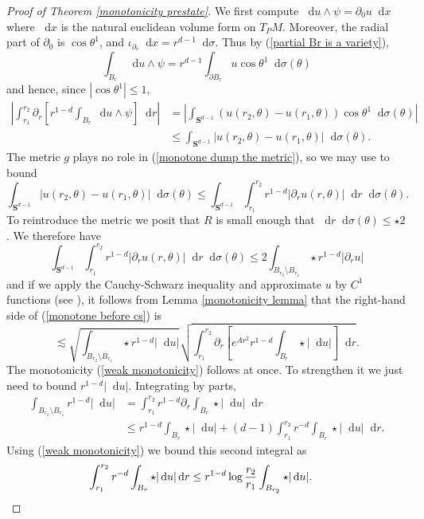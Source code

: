 \documentclass[reqno,10pt]{amsart}
\newcommand{\Sph}{\mathbf S}
\newcommand*\dif{\mathop{}\!\mathrm{d}}
\theoremstyle{definition}
\numberwithin{equation}{section}
\begin{document}
\begin{proof}[Proof of Theorem \ref{monotonicity prestate}]
We first compute $\dif u \wedge \psi = \partial_0 u \dif x$
where $\dif x$ is the natural euclidean volume form on $T_PM$.
Moreover, the radial part of $\partial_0$ is $\cos \theta^1$, and $\iota_{\partial_r} \dif x = r^{d - 1} \dif \sigma$.
Thus by (\ref{partial Br is a variety}),
$$\int_{B_r} \dif u \wedge \psi = r^{d - 1}\int_{\partial B_r} u \cos \theta^1 \dif \sigma(\theta)$$
and hence, since $|\cos \theta^1| \leq 1$,
\begin{align}
\left|\int_{r_1}^{r_2} \partial_r \left[r^{1 - d}\int_{B_r} \dif u \wedge \psi\right] \dif r\right|
&= \left|\int_{\Sph^{d - 1}} (u(r_2, \theta) - u(r_1, \theta)) \cos \theta^1 \dif \sigma(\theta)\right| \\
&\leq \int_{\Sph^{d - 1}} |u(r_2, \theta) - u(r_1, \theta)| \dif \sigma(\theta). \label{monotone dump the metric}
\end{align}
The metric $g$ plays no role in (\ref{monotone dump the metric}), so we may use \cite[Lemma 5.3]{Giusti77} to bound
$$\int_{\Sph^{d - 1}} |u(r_2, \theta) - u(r_1, \theta)| \dif \sigma(\theta) \leq \int_{\Sph^{d - 1}} \int_{r_1}^{r_2} r^{1 - d}|\partial_r u(r, \theta)| \dif r \dif\sigma(\theta).$$
To reintroduce the metric we posit that $R$ is small enough that $\dif r \dif \sigma(\theta) \leq \star 2$.
We therefore have
\begin{equation}\label{monotone before cs}
\int_{\Sph^{d - 1}} \int_{r_1}^{r_2} r^{1 - d}|\partial_r u(r, \theta)| \dif r \dif\sigma(\theta) \leq 2 \int_{B_{r_2} \setminus B_{r_1}} \star r^{1 - d}|\partial_r u|
\end{equation}
and if we apply the Cauchy-Schwarz inequality and approximate $u$ by $C^1$ functions (see \cite[pg68]{Giusti77}), it follows from Lemma \ref{monotonicity lemma} that the right-hand side of (\ref{monotone before cs}) is
$$\lesssim \sqrt{\int_{B_{r_2} \setminus B_{r_1}} \star r^{1 - d} |\dif u|} \sqrt{\int_{r_1}^{r_2} \partial_r \left[e^{Ar^2} r^{1-d}\int_{B_r} \star |\dif u|\right] \dif r}.$$
The monotonicity (\ref{weak monotonicity}) follows at once. To strengthen it we just need to bound $r^{1 - d} |\dif u|$.
Integrating by parts,
\begin{align*}
\int_{B_{r_2} \setminus B_{r_1}} r^{1 - d} |\dif u| &= \int_{r_1}^{r_2} r^{1 - d} \partial_r \int_{B_r} \star |\dif u| \dif r \\
&\leq r^{1 - d} \int_{B_r} \star |\dif u| + (d - 1) \int_{r_1}^{r_2} r^{-d} \int_{B_r} \star |\dif u| \dif r.
\end{align*}
Using (\ref{weak monotonicity}) we bound this second integral as
\begin{align*}
\int_{r_1}^{r_2} r^{-d} \int_{B_r} \star |\dif u| \dif r &\leq r^{1 - d} \log \frac{r_2}{r_1} \int_{B_{r_2}} \star |\dif u|. \qedhere
\end{align*}
\end{proof}
\end{document}
